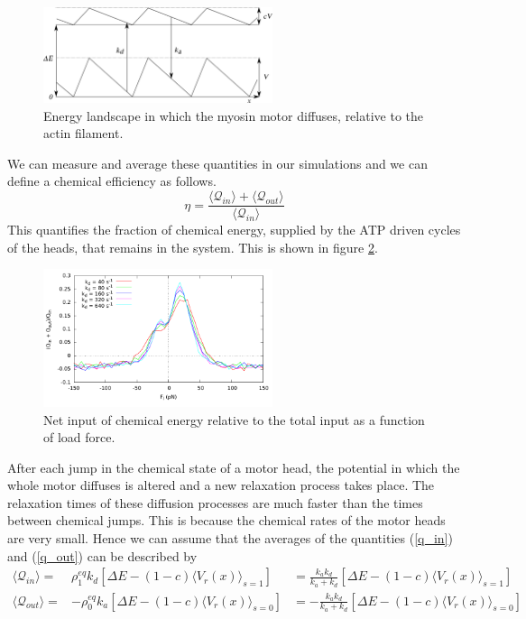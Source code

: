 \documentclass[aps,pre,onecolumn,showpacs,showkeys,a4paper]{revtex4}
\begin{document}
\begin{figure}[h]
\centering
\includegraphics[width=0.6\textwidth,height=!]{energy}
\caption{Energy landscape in which the myosin motor diffuses, relative to the actin filament.}
\label{Fig: energy}
\end{figure}
 We can measure and average these quantities in our simulations and we can define a chemical efficiency as follows.
\begin{equation}
\eta = \frac{\langle\mathcal Q_{in}\rangle+\langle\mathcal Q_{out}\rangle}{\langle\mathcal Q_{in}\rangle}
\end{equation}
This quantifies the fraction of chemical energy, supplied by the ATP driven cycles of the heads, that remains in the system. This is shown in figure \ref{Fig: chem}.
\begin{figure}[h]
\centering
\includegraphics[width=0.6\textwidth,height=!]{chemical_cycle}
\caption{Net input of chemical energy relative to the total input as a function of load force.}
\label{Fig: chem}
\end{figure}
\par
After each jump in the chemical state of a motor head, the potential in which the whole motor diffuses is altered and a new relaxation process takes place. The relaxation times of these diffusion processes are much faster than the times between chemical jumps. This is because the chemical rates of the motor heads are very small. Hence we can assume that the averages of the quantities (\ref{q_in}) and (\ref{q_out}) can be described by
\begin{eqnarray}
\langle \mathcal Q_{in} \rangle =& \rho^{eq}_1 k_d \left[\Delta E - (1-c)\langle V_r(x) \rangle_{s=1} \right] &= \frac{k_a k_d}{k_a + k_d}\left[\Delta E - (1-c)\langle V_r(x) \rangle_{s=1} \right] \label{Q_in}\\
\langle \mathcal Q_{out} \rangle =& -\rho^{eq}_0 k_a \left[\Delta E - (1-c)\langle V_r(x) \rangle_{s=0} \right] &= -\frac{k_a k_d}{k_a + k_d}\left[\Delta E - (1-c)\langle V_r(x) \rangle_{s=0} \right]\label{Q_out}
\end{eqnarray}
\end{document}
